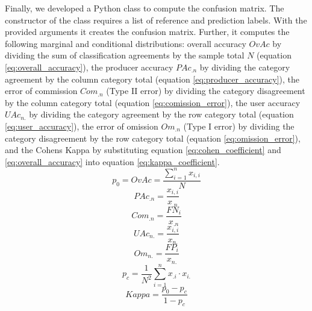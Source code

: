 			Finally, we developed a Python class to compute the confusion matrix. The constructor of the class requires a list of reference and prediction labels. With the provided arguments it creates the confusion matrix. Further, it computes the following marginal and conditional distributions: overall accuracy $OvAc$ by dividing the sum of classification agreements by the sample total $N$ (equation \ref{eq:overall_accuracy}), the producer accuracy $PAc_{.n}$ by dividing the category agreement by the column category total (equation \ref{eq:producer_accuracy}), the error of commission $Com_{.n}$ (Type II error) by dividing the category disagreement by the column category total (equation \ref{eq:comission_error}), the user accuracy $UAc_{n.}$ by dividing the category agreement by the row category total (equation \ref{eq:user_accuracy}), the error of omission $Om_{.n}$ (Type I error) by dividing the category disagreement by the row category total (equation \ref{eq:omission_error}), and the Cohens Kappa by substituting equation \ref{eq:cohen_coefficient} and \ref{eq:overall_accuracy} into equation \ref{eq:kappa_coefficient}.
			\begin{equation}
			\label{eq:overall_accuracy}
				p_0=OvAc = \frac{\displaystyle\sum_{i=1}^{n}x_{i,i}}{N}
			\end{equation}
			\begin{equation}
			\label{eq:producer_accuracy}
				PAc_{.n} = \frac{x_{i,i}}{x_{.n}}
			\end{equation}
			\begin{equation}
			\label{eq:comission_error}
				Com_{.n} = \frac{FN_i}{x_{.n}}
			\end{equation}
			\begin{equation}
			\label{eq:user_accuracy}
				UAc_{n.} = \frac{x_{i,i}}{x_{n.}}
			\end{equation}
			\begin{equation}
			\label{eq:omission_error}
				Om_{n.} = \frac{FP_i}{x_{n.}}
			\end{equation}
			\begin{equation}
			\label{eq:cohen_coefficient}
				p_c = \frac{1}{N^2}\displaystyle\sum_{i=1}^{n} x_{.i} \cdot x_{i.}
			\end{equation}
			\begin{equation}
			\label{eq:kappa_coefficient}
				Kappa = \frac{p_0-p_c}{1-p_c}
			\end{equation}

